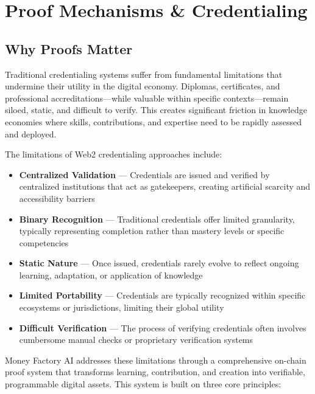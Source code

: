 \section{Proof Mechanisms \& Credentialing}


\subsection{Why Proofs Matter}

Traditional credentialing systems suffer from fundamental limitations that undermine their utility in the digital economy. Diplomas, certificates, and professional accreditations—while valuable within specific contexts—remain siloed, static, and difficult to verify. This creates significant friction in knowledge economies where skills, contributions, and expertise need to be rapidly assessed and deployed.

The limitations of Web2 credentialing approaches include:

\begin{itemize}
    \item \textbf{Centralized Validation} — Credentials are issued and verified by centralized institutions that act as gatekeepers, creating artificial scarcity and accessibility barriers
    
    \item \textbf{Binary Recognition} — Traditional credentials offer limited granularity, typically representing completion rather than mastery levels or specific competencies
    
    \item \textbf{Static Nature} — Once issued, credentials rarely evolve to reflect ongoing learning, adaptation, or application of knowledge
    
    \item \textbf{Limited Portability} — Credentials are typically recognized within specific ecosystems or jurisdictions, limiting their global utility
    
    \item \textbf{Difficult Verification} — The process of verifying credentials often involves cumbersome manual checks or proprietary verification systems
\end{itemize}

Money Factory AI addresses these limitations through a comprehensive on-chain proof system that transforms learning, contribution, and creation into verifiable, programmable digital assets. This system is built on three core principles:

